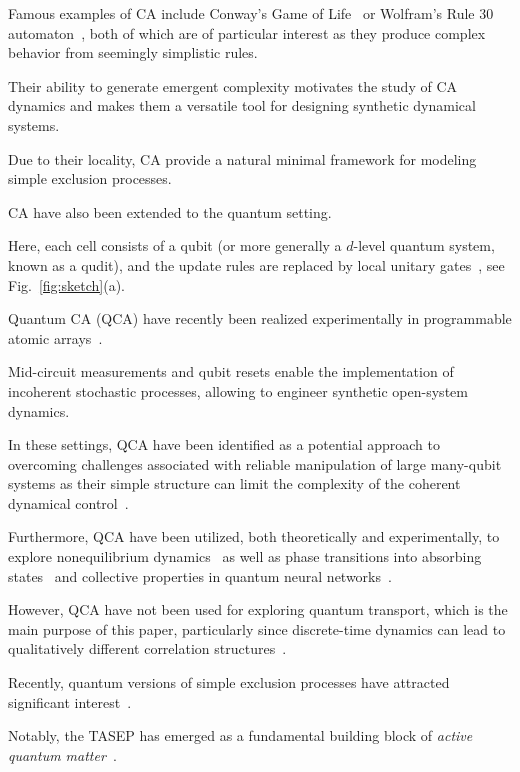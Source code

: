 \documentclass[aps,prl,twocolumn,groupedaddress,superscriptaddress,colorlinks,bookmarks=false,citecolor=darkspringgreen,linkcolor=darkolivegreen,urlcolor=navyblue]{revtex4-1}
\begin{document}
Famous examples of CA include Conway's Game of Life~\cite{Gard70} or Wolfram's Rule 30 automaton~\cite{Wolf83,Wolf85}, both of which are of particular interest as they produce complex behavior from seemingly simplistic rules.

Their ability to generate emergent complexity motivates the study of CA dynamics and makes them a versatile tool for designing synthetic dynamical systems.

Due to their locality, CA provide a natural minimal framework for modeling simple exclusion processes.


CA have also been extended to the quantum setting.

Here, each cell consists of a qubit (or more generally a $d$-level quantum system, known as a qudit), and the update rules are replaced by local unitary gates~\cite{Farrelly2020}, see Fig.~\ref{fig:sketch}(a).

Quantum CA (QCA) have recently been realized experimentally in programmable atomic arrays~\cite{White2026}.

Mid-circuit measurements and qubit resets enable the implementation of incoherent stochastic processes, allowing to engineer synthetic open-system dynamics.

In these settings, QCA have been identified as a potential approach to overcoming challenges associated with reliable manipulation of large many-qubit systems as their simple structure can limit the complexity of the coherent dynamical control~\cite{Cesa2026,White2026}.

Furthermore, QCA have been utilized, both theoretically and experimentally, to explore nonequilibrium dynamics~\cite{Duranthon21,Gill20,sfairopoulos25} as well as phase transitions into absorbing states~\cite{Lesa19} and collective properties in quantum neural networks~\cite{Wintermantel20,Gill23,Boneberg_24,Boneberg_25}.

However, QCA have not been used for exploring quantum transport, which is the main purpose of this paper, particularly since discrete-time dynamics can lead to qualitatively different correlation structures~\cite{Wald2025}.


Recently, quantum versions of simple exclusion processes have attracted significant interest~\cite{Albert2026, Bernard21, Bernard22, Bernard25, Alba2025,Russotto2025}.

Notably, the TASEP has emerged as a fundamental building block of {\it active quantum matter}~\cite{Kha24}.
\end{document}
